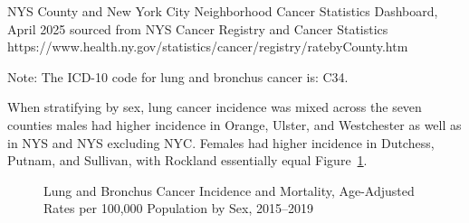 \documentclass[
  english,
  letterpaper,
]{report}
\begin{document}
\begin{tcolorbox}[enhanced jigsaw, breakable, leftrule=.75mm, title=\textcolor{quarto-callout-note-color}{\faInfo}\hspace{0.5em}{Source}, bottomrule=.15mm, opacityback=0, left=2mm, colback=white, bottomtitle=1mm, coltitle=black, colbacktitle=quarto-callout-note-color!10!white, colframe=quarto-callout-note-color-frame, opacitybacktitle=0.6, toptitle=1mm, titlerule=0mm, arc=.35mm, rightrule=.15mm, toprule=.15mm]

NYS County and New York City Neighborhood Cancer Statistics Dashboard,
April 2025 sourced from NYS Cancer Registry and Cancer Statistics
https://www.health.ny.gov/statistics/cancer/registry/ratebyCounty.htm

\end{tcolorbox}

\begin{tcolorbox}[enhanced jigsaw, breakable, leftrule=.75mm, title=\textcolor{quarto-callout-note-color}{\faInfo}\hspace{0.5em}{Note}, bottomrule=.15mm, opacityback=0, left=2mm, colback=white, bottomtitle=1mm, coltitle=black, colbacktitle=quarto-callout-note-color!10!white, colframe=quarto-callout-note-color-frame, opacitybacktitle=0.6, toptitle=1mm, titlerule=0mm, arc=.35mm, rightrule=.15mm, toprule=.15mm]

Note: The ICD-10 code for lung and bronchus cancer is: C34.

\end{tcolorbox}

When stratifying by sex, lung cancer incidence was mixed across the
seven counties males had higher incidence in Orange, Ulster, and
Westchester as well as in NYS and NYS excluding NYC. Females had higher
incidence in Dutchess, Putnam, and Sullivan, with Rockland essentially
equal Figure~\ref{fig-lungbronchca-incident-mortal-sex-aar}.

\begin{figure}


\caption{\label{fig-lungbronchca-incident-mortal-sex-aar}Lung and
Bronchus Cancer Incidence and Mortality, Age-Adjusted Rates per 100,000
Population by Sex, 2015--2019}

\end{figure}%
\end{document}
